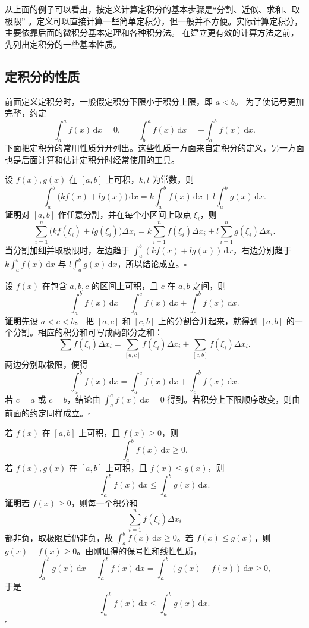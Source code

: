 \documentclass[fontset=fandol]{ctexart}
\newcommand{\dd}{\mathrm{d}}
\begin{document}
从上面的例子可以看出，按定义计算定积分的基本步骤是“分割、近似、求和、取极限”
。定义可以直接计算一些简单定积分，但一般并不方便。实际计算定积分，主要依靠后面的微积分基本定理和各种积分法。
在建立更有效的计算方法之前，先列出定积分的一些基本性质。

\subsection{定积分的性质}

前面定义定积分时，一般假定积分下限小于积分上限，即 $a<b$。 为了使记号更加完整，约定
\[
\int_a^a f(x)\,\dd x=0,\qquad
\int_b^a f(x)\,\dd x=-\int_a^b f(x)\,\dd x.
\]
下面把定积分的常用性质分开列出。这些性质一方面来自定积分的定义，另一方面也是后面计算和估计定积分时经常使用的工具。

\begin{proposition}[线性性质]
设 $f(x),g(x)$ 在 $[a,b]$ 上可积，$k,l$ 为常数，则
\[
\int_a^b \bigl(kf(x)+lg(x)\bigr)\,\dd x
=k\int_a^b f(x)\,\dd x+l\int_a^b g(x)\,\dd x.
\]
\textbf{证明}\quad 对 $[a,b]$ 作任意分割，并在每个小区间上取点 $\xi_i$，则
\[
\sum_{i=1}^n\bigl(kf(\xi_i)+lg(\xi_i)\bigr)\Delta x_i
=k\sum_{i=1}^n f(\xi_i)\Delta x_i
+l\sum_{i=1}^n g(\xi_i)\Delta x_i.
\]
当分割加细并取极限时，左边趋于 $\int_a^b (kf(x)+lg(x))\,\dd x$，右边分别趋于 $k\int_a^b f(x)\,\dd x$ 与 $l\int_a^b g(x)\,\dd x$，所以结论成立。\hfill$\square$
\end{proposition}

\begin{proposition}[区间可加性]
设 $f(x)$ 在包含 $a,b,c$ 的区间上可积，且 $c$ 在 $a,b$ 之间，则
\[
\int_a^b f(x)\,\dd x=\int_a^c f(x)\,\dd x+\int_c^b f(x)\,\dd x.
\]
\textbf{证明}\quad 先设 $a<c<b$。 把 $[a,c]$ 和 $[c,b]$ 上的分割合并起来，就得到 $[a,b]$ 的一个分割。相应的积分和可写成两部分之和：
\[
\sum f(\xi_i)\Delta x_i
=\sum_{[a,c]} f(\xi_i)\Delta x_i+\sum_{[c,b]} f(\xi_i)\Delta x_i.
\]
两边分别取极限，便得
\[
\int_a^b f(x)\,\dd x=\int_a^c f(x)\,\dd x+\int_c^b f(x)\,\dd x.
\]
若 $c=a$ 或 $c=b$，结论由 $\int_a^a f(x)\,\dd x=0$ 得到。若积分上下限顺序改变，则由前面的约定同样成立。\hfill$\square$
\end{proposition}

\begin{proposition}[保号性与保序性]
若 $f(x)$ 在 $[a,b]$ 上可积，且 $f(x)\geq0$，则
\[
\int_a^b f(x)\,\dd x\geq0.
\]
若 $f(x),g(x)$ 在 $[a,b]$ 上可积，且 $f(x)\leq g(x)$，则
\[
\int_a^b f(x)\,\dd x\leq \int_a^b g(x)\,\dd x.
\]
\textbf{证明}\quad 若 $f(x)\geq0$，则每一个积分和
\[
\sum_{i=1}^n f(\xi_i)\Delta x_i
\]
都非负，取极限后仍非负，故 $\int_a^b f(x)\,\dd x\geq0$。若 $f(x)\leq g(x)$，则 $g(x)-f(x)\geq0$。由刚证得的保号性和线性性质，
\[
\int_a^b g(x)\,\dd x-\int_a^b f(x)\,\dd x
=\int_a^b (g(x)-f(x))\,\dd x\geq0,
\]
于是
\[
\int_a^b f(x)\,\dd x\leq \int_a^b g(x)\,\dd x.
\]
\noindent\hfill$\square$
\end{proposition}
\end{document}
